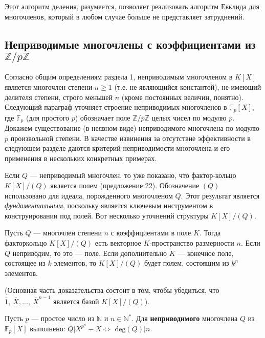 Этот алгоритм деления, разумеется, позволяет реализовать  
алгоритм Евклида для многочленов, который в любом случае больше не 
представляет затруднений. 
\subsection{Неприводимые многочлены с коэффициентами из $\mathbb{Z}\slash p\mathbb{Z}$} 
Согласно общим определениям раздела 1, неприводимым многочленом 
в $K[X]$ является многочлен степени $n\geqslant 1$ (т.е. не являющийся  
константой), не имеющий делителя степени, строго меньшей $n$ (кроме  
постоянных величин, понятно). Следующий параграф уточняет строение 
неприводимых многочленов в $\mathbb{F}_p[X]$, где $\mathbb{F}_p$ (для простого $p$) обозначает 
поле \linebreak$\mathbb{Z}\slash p\mathbb{Z}$ целых чисел по модулю $p$. Докажем существование (в неявном 
виде) неприводимого многочлена по модулю $p$ произвольной степени. 
В качестве извинения за отсутствие эффективности в следующем  
разделе даются критерий неприводимости многочлена и его применения в 
нескольких конкретных примерах. 

Если $Q$ — неприводимый многочлен, то уже показано, что фактор-кольцо\linebreak
$K[X]\slash(Q)$ является полем (предложение 22). Обозначение $(Q)$  
использовано для идеала, порожденного многочленом $Q$. Этот результат 
является \textit{фундаментальным}, поскольку является ключевым  
инструментом в конструировании под полей. Вот несколько уточнений структуры 
$K[X]\slash(Q)$. 

\begin{predl}
\hspace*{15pt}Пусть $Q$ — многочлен степени $n$ с коэффициентами в поле $K$. Тогда 
факторкольцо $K[X]\slash(Q)$ есть векторное $K$-пространство размерности 
$n$. Если $Q$ неприводим, то это — поле. Если дополнительно $K$ —  
конечное поле, состоящее из $k$ элементов, то $K[X]\slash(Q)$ будет полем,  
состоящим из $k^n$ элементов.
\end{predl}

(Основная часть доказательства состоит в том, чтобы убедиться, 
что\linebreak $\overline{1},\: \overline{X},...,\: \overline{X}^{n-1}\text{ является базой }K[X]\slash(Q)$).

\begin{thm}
\hspace*{15pt}Пусть $p$ — простое число из $\mathbb{N}$ и $ n \in \mathbb{N}^*$. Для \textbf{неприводимого} 
многочлена $Q$ из $\mathbb{F}_p[X]$ выполнено: $Q | X^{p^n} - X \Leftrightarrow$ $\text{deg}(Q) | n$.
\end{thm} 
\pagebreak

